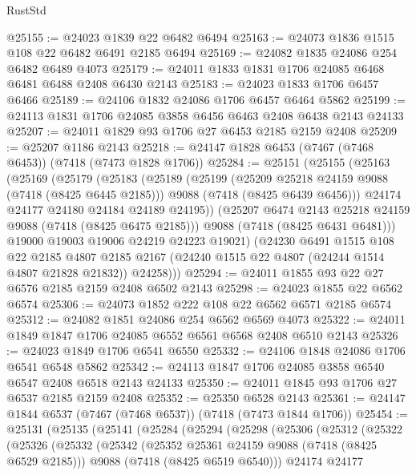 \begin{lexlean}{RustStd}
\begin{coremodule}
@25155 := @24023 @1839 @22 @6482 @6494
@25163 := @24073 @1836 @1515 @108 @22 @6482 @6491 @2185 @6494
@25169 := @24082 @1835 @24086 @254 @6482 @6489 @4073
@25179 := @24011 @1833 @1831 @1706 @24085 @6468 @6481 @6488 @2408 @6430 @2143
@25183 := @24023 @1833 @1706 @6457 @6466
@25189 := @24106 @1832 @24086 @1706 @6457 @6464 @5862
@25199 := @24113 @1831 @1706 @24085 @3858 @6456 @6463 @2408 @6438 @2143 @24133
@25207 := @24011 @1829 @93 @1706 @27 @6453 @2185 @2159 @2408
@25209 := @25207 @1186 @2143
@25218 := @24147 @1828 @6453 (@7467 (@7468 @6453)) (@7418 (@7473 @1828 @1706))
@25284 := @25151
    (@25155
      (@25163
        (@25169
          (@25179
            (@25183
              (@25189
                (@25199
                  (@25209 @25218 @24159 @9088 (@7418 (@8425 @6445 @2185)))
                  @9088
                  (@7418 (@8425 @6439 @6456)))
                @24174
                @24177
                @24180
                @24184
                @24189
                @24195))
            (@25207 @6474 @2143 @25218 @24159 @9088 (@7418 (@8425 @6475 @2185)))
            @9088
            (@7418 (@8425 @6431 @6481)))
          @19000
          @19003
          @19006
          @24219
          @24223
          @19021)
        (@24230
          @6491
          @1515
          @108
          @22
          @2185
          @4807
          @2185
          @2167
          (@24240 @1515 @22 @4807 (@24244 @1514 @4807 @21828 @21832))
          @24258)))
@25294 := @24011 @1855 @93 @22 @27 @6576 @2185 @2159 @2408 @6502 @2143
@25298 := @24023 @1855 @22 @6562 @6574
@25306 := @24073 @1852 @222 @108 @22 @6562 @6571 @2185 @6574
@25312 := @24082 @1851 @24086 @254 @6562 @6569 @4073
@25322 := @24011 @1849 @1847 @1706 @24085 @6552 @6561 @6568 @2408 @6510 @2143
@25326 := @24023 @1849 @1706 @6541 @6550
@25332 := @24106 @1848 @24086 @1706 @6541 @6548 @5862
@25342 := @24113 @1847 @1706 @24085 @3858 @6540 @6547 @2408 @6518 @2143 @24133
@25350 := @24011 @1845 @93 @1706 @27 @6537 @2185 @2159 @2408
@25352 := @25350 @6528 @2143
@25361 := @24147 @1844 @6537 (@7467 (@7468 @6537)) (@7418 (@7473 @1844 @1706))
@25454 := @25131
    (@25135
      (@25141
        (@25284
          (@25294
            (@25298
              (@25306
                (@25312
                  (@25322
                    (@25326
                      (@25332
                        (@25342
                          (@25352 @25361 @24159 @9088 (@7418 (@8425 @6529 @2185)))
                          @9088
                          (@7418 (@8425 @6519 @6540)))
                        @24174
                        @24177

\end{coremodule}
\end{lexlean}
